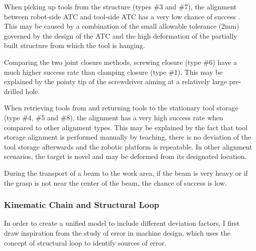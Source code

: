 \begin{description}[style=unboxed] %
	\item [Tight tolerance, deviation of partially assembled structure] When picking up tools from the structure (types \#3 and \#7), the alignment between robot-side ATC and tool-side ATC has a very low chance of success . This may be caused by a combination of the small allowable tolerance (2mm) governed by the design of the ATC and the high deformation of the partially built structure from which the tool is hanging. 

	\item [Correction range] Comparing the two joint closure methods, screwing closure (type \#6) have a much higher success rate than clamping closure (type \#1). This may be explained by the pointy tip of the screwdriver aiming at a relatively large pre-drilled hole.

	\item [Deviation] When retrieving tools from and returning tools to the stationary tool storage (type \#4, \#5 and \#8), the alignment has a very high success rate when compared to other alignment types. This may be explained by the fact that tool storage alignment is performed manually by teaching, there is no deviation of the tool storage afterwards and the robotic platform is repeatable. In other alignment scenarios, the target is novel and may be deformed from its designated location.

	\item [Payload] During the transport of a beam to the work area, if the beam is very heavy  or if the grasp is not near the center of the beam, the chance of success is low. 

\end{description}

\subsubsection{Kinematic Chain and Structural Loop}
\label{subsubsection:kinematic-chain-and-structural-loop}

In order to create a unified model to include different deviation factors, I first draw inspiration from the study of error in machine design, which uses the concept of structural loop to identify sources of error.


